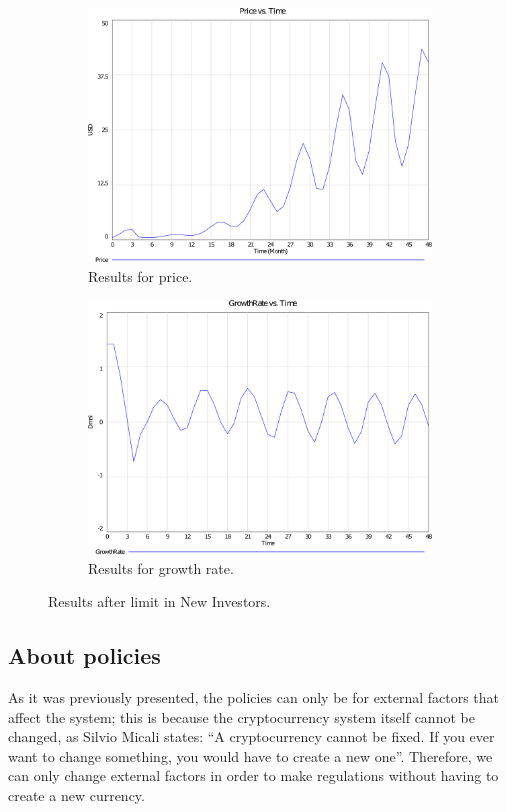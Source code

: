     \begin{figure}[H]
      \centering
      \begin{subfigure}[t]{0.4\textwidth}
        \includegraphics[scale = 0.3]{files/politInvPrice.pdf}
        \centering
        \caption{Results for price.}
      \end{subfigure}
      \hspace{1cm}
      \begin{subfigure}[t]{0.4\textwidth}
        \includegraphics[scale = 0.3]{files/politInvGrowth.pdf}
        \centering
        \caption{Results for growth rate.}
      \end{subfigure}
      \caption{Results after limit in New Investors.}
      \label{img:politinv}
	\end{figure}
   
   \subsection{About policies}
   As it was previously presented, the policies can only be for external factors that affect the system; this is because the cryptocurrency system itself cannot be changed, as Silvio Micali \cite{silvio} states: ``A cryptocurrency cannot be fixed. If you ever want to change something, you would have to create a new one''. Therefore, we can only change external factors in order to make regulations without having to create a new currency.
